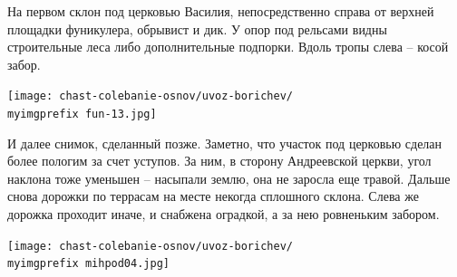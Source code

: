 На первом склон под церковью Василия, непосредственно справа от верхней площадки фуникулера, обрывист и дик. У опор под рельсами видны строительные леса либо дополнительные подпорки. Вдоль тропы слева – косой забор.

\begin{center}
\texttt{[image: chast-colebanie-osnov/uvoz-borichev/\\myimgprefix fun-13.jpg]}
\end{center}

И далее снимок, сделанный позже. Заметно, что участок под церковью сделан более пологим за счет уступов. За ним, в сторону Андреевской церкви, угол наклона тоже уменьшен – насыпали землю, она не заросла еще травой. Дальше снова дорожки по террасам на месте некогда сплошного склона. Слева же дорожка проходит иначе, и снабжена оградкой, а за нею ровненьким забором.

\begin{center}
\texttt{[image: chast-colebanie-osnov/uvoz-borichev/\\myimgprefix mihpod04.jpg]}
\end{center}
